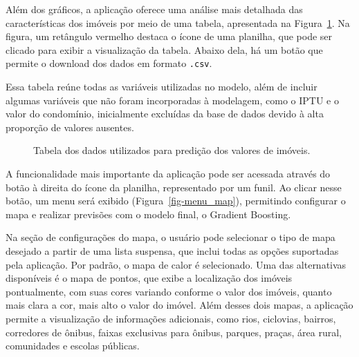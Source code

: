 \documentclass[
  12pt,
  a4paper,
]{scrreprt}
\begin{document}
\vspace{12pt}

Além dos gráficos, a aplicação oferece uma análise mais detalhada das
características dos imóveis por meio de uma tabela, apresentada na
Figura~\ref{fig-table_app}. Na figura, um retângulo vermelho destaca o
ícone de uma planilha, que pode ser clicado para exibir a visualização
da tabela. Abaixo dela, há um botão que permite o download dos dados em
formato \texttt{.csv}.

\vspace{12pt}

Essa tabela reúne todas as variáveis utilizadas no modelo, além de
incluir algumas variáveis que não foram incorporadas à modelagem, como o
IPTU e o valor do condomínio, inicialmente excluídas da base de dados
devido à alta proporção de valores ausentes.

\begin{figure}


\caption{\label{fig-table_app}Tabela dos dados utilizados para predição
dos valores de imóveis.}

\end{figure}%

A funcionalidade mais importante da aplicação pode ser acessada através
do botão à direita do ícone da planilha, representado por um funil. Ao
clicar nesse botão, um menu será exibido (Figura~\ref{fig-menu_map}),
permitindo configurar o mapa e realizar previsões com o modelo final, o
Gradient Boosting.

\vspace{12pt}

Na seção de configurações do mapa, o usuário pode selecionar o tipo de
mapa desejado a partir de uma lista suspensa, que inclui todas as opções
suportadas pela aplicação. Por padrão, o mapa de calor é selecionado.
Uma das alternativas disponíveis é o mapa de pontos, que exibe a
localização dos imóveis pontualmente, com suas cores variando conforme o
valor dos imóveis, quanto mais clara a cor, mais alto o valor do imóvel.
Além desses dois mapas, a aplicação permite a visualização de
informações adicionais, como rios, ciclovias, bairros, corredores de
ônibus, faixas exclusivas para ônibus, parques, praças, área rural,
comunidades e escolas públicas.
\end{document}

